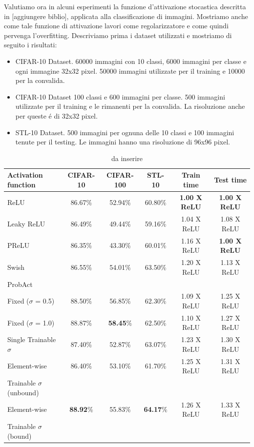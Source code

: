 \documentclass[a4paper,10pt]{article}
\begin{document}
 Valutiamo ora in alcuni esperimenti la funzione d'attivazione stocastica descritta in [aggiungere biblio], applicata alla classificazione di immagini. Mostriamo anche come tale funzione di attivazione lavori come regolarizzatore e come quindi pervenga l'overfitting. Descriviamo prima i dataset utilizzati e mostriamo di seguito i risultati:
 \begin{itemize}
  \item CIFAR-10 Dataset. 60000 immagini con 10 classi, 6000 immagini per classe e ogni immagine 32x32 pixel. 50000 immagini utilizzate per il training e 10000 per la convalida. 
  \item CIFAR-10 Dataset 100 classi e 600 immagini per classe. 500 immagini utilizzate per il training e le rimanenti per la convalida. La risoluzione anche per queste \'e di 32x32 pixel. 
  \item STL-10 Dataset. 500 immagini per ognuna delle 10 classi e 100 immagini tenute per il testing. Le immagini hanno una risoluzione di 96x96 pixel.
 \end{itemize}
 
 \begin{table}[h]\caption{da inserire}\label{ActFuncTestTab}
   \centering
   \begin{tabular}[h]{|l|c|c|c|c|c|}
    \hline
   Activation function & CIFAR-10 & CIFAR-100 & STL-10 & Train time & Test time \\ \hline
   ReLU & 86.67\% & 52.94\% & 60.80\% & \textbf{1.00 X ReLU} & \textbf{1.00 X ReLU} \\ 
   Leaky ReLU & 86.49\% & 49.44\% & 59.16\% & 1.04 X ReLU & 1.08 X ReLU \\
   PReLU & 86.35\% & 43.30\% & 60.01\% & 1.16 X ReLU & \textbf{1.00 X ReLU} \\
   Swish & 86.55\% & 54.01\% & 63.50\% & 1.20 X ReLU & 1.13 X ReLU \\
   \hline
   ProbAct & & & & & \\
   \quad Fixed ($\sigma$ = 0.5) & 88.50\% & 56.85\% & 62.30\% & 1.09 X ReLU & 1.25 X ReLU \\
   \quad Fixed ($\sigma$ = 1.0) & 88.87\% & \textbf{58.45}\% & 62.50\% & 1.10 X ReLU & 1.27 X ReLU \\
   \quad Single Trainable $\sigma$ & 87.40\% & 52.87\% & 63.07\% & 1.23 X ReLU & 1.30 X ReLU \\
   \quad Element-wise & 86.40\% & 53.10\% & 61.70\% & 1.25 X ReLU & 1.31 X ReLU \\
   \qquad Trainable $\sigma$ (unbound)  & & & & & \\
   \quad Element-wise & \textbf{88.92}\% & 55.83\% & \textbf{64.17}\% & 1.26 X ReLU & 1.33 X ReLU \\
   \qquad Trainable $\sigma$ (bound)  & & & & & \\
   \hline
   \end{tabular}
  \end{table}
  
\end{document}
